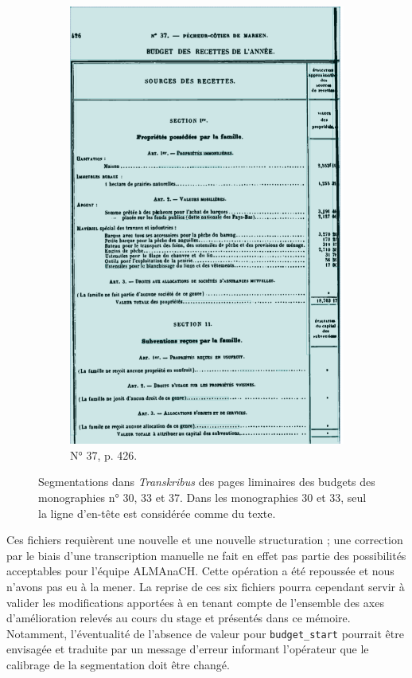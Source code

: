 \begin{figure}[t]
\begin{subfigure}{0.3\textwidth}
     \includegraphics[width=1\linewidth]{img/transkribus_37.png}
     \caption{N° 37, p. 426.}
     \label{fig:odm37tkb}
    \end{subfigure}
    \caption{Segmentations dans \textit{Transkribus} des pages liminaires des budgets des monographies n° 30,  33 et 37. Dans les monographies 30 et 33, seul la ligne d'en-tête est considérée comme du texte.}
    \label{fig:odmtkbs1t4}
\end{figure}

Ces fichiers requièrent une nouvelle \ocr{} et une nouvelle structuration ; une correction par le biais d'une transcription manuelle ne fait en effet pas partie des possibilités acceptables pour l'équipe ALMAnaCH. Cette opération a été repoussée et nous n'avons pas eu à la mener. La reprise de ces six fichiers pourra cependant servir à valider les modifications apportées à \lse{} en tenant compte de l'ensemble des axes d'amélioration relevés au cours du stage et présentés dans ce mémoire. Notamment, l'éventualité de l'absence de valeur pour \texttt{budget\_start} pourrait 
être envisagée et traduite par un message d'erreur informant l'opérateur que le calibrage de la segmentation doit être changé.

